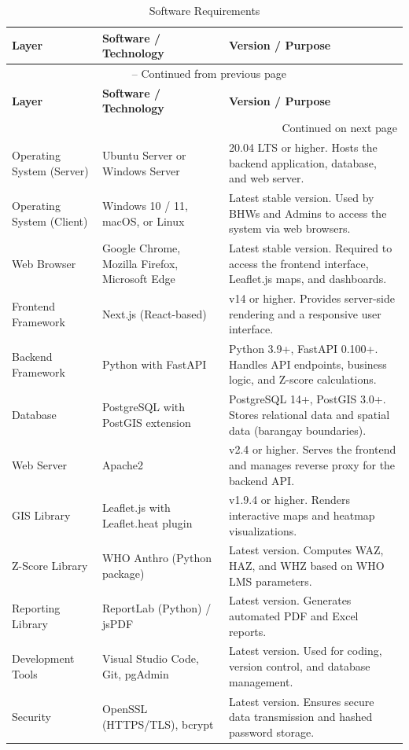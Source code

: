 \documentclass[12pt, a4paper]{report}
\begin{document}
\vspace{0.3cm}
\begin{longtable}{p{3cm} p{5cm} p{6cm}}
    \caption{Software Requirements} \label{tab:software} \\
    \toprule
    \textbf{Layer} & \textbf{Software / Technology} & \textbf{Version / Purpose} \\
    \midrule
    \endfirsthead
    \multicolumn{3}{c}{{\tablename\ \thetable{} -- Continued from previous page}} \\
    \toprule
    \textbf{Layer} & \textbf{Software / Technology} & \textbf{Version / Purpose} \\
    \midrule
    \endhead
    \midrule
    \multicolumn{3}{r}{{Continued on next page}} \\
    \endfoot
    \bottomrule
    \endlastfoot
    Operating System (Server) & Ubuntu Server or Windows Server & 20.04 LTS or higher. Hosts the backend application, database, and web server. \\
    \addlinespace
    Operating System (Client) & Windows 10 / 11, macOS, or Linux & Latest stable version. Used by BHWs and Admins to access the system via web browsers. \\
    \addlinespace
    Web Browser & Google Chrome, Mozilla Firefox, Microsoft Edge & Latest stable version. Required to access the frontend interface, Leaflet.js maps, and dashboards. \\
    \addlinespace
    Frontend Framework & Next.js (React-based) & v14 or higher. Provides server-side rendering and a responsive user interface. \\
    \addlinespace
    Backend Framework & Python with FastAPI & Python 3.9+, FastAPI 0.100+. Handles API endpoints, business logic, and Z-score calculations. \\
    \addlinespace
    Database & PostgreSQL with PostGIS extension & PostgreSQL 14+, PostGIS 3.0+. Stores relational data and spatial data (barangay boundaries). \\
    \addlinespace
    Web Server & Apache2 & v2.4 or higher. Serves the frontend and manages reverse proxy for the backend API. \\
    \addlinespace
    GIS Library & Leaflet.js with Leaflet.heat plugin & v1.9.4 or higher. Renders interactive maps and heatmap visualizations. \\
    \addlinespace
    Z-Score Library & WHO Anthro (Python package) & Latest version. Computes WAZ, HAZ, and WHZ based on WHO LMS parameters. \\
    \addlinespace
    Reporting Library & ReportLab (Python) / jsPDF & Latest version. Generates automated PDF and Excel reports. \\
    \addlinespace
    Development Tools & Visual Studio Code, Git, pgAdmin & Latest version. Used for coding, version control, and database management. \\
    \addlinespace
    Security & OpenSSL (HTTPS/TLS), bcrypt & Latest version. Ensures secure data transmission and hashed password storage. \\
\end{longtable}
\vspace{0.3cm}
\end{document}
